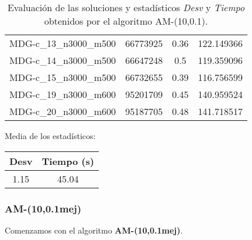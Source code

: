 \documentclass{article}
\begin{document}
\begin{table}[H]
\begin{tabular}{|cccc|}
		MDG-c\_13\_n3000\_m500 & 66773925 & 0.36 & 122.149366\\
		MDG-c\_14\_n3000\_m500 & 66647248 & 0.5 & 119.359096\\
		MDG-c\_15\_n3000\_m500 & 66732655 & 0.39 & 116.756599\\
		MDG-c\_19\_n3000\_m600 & 95201709 & 0.45 & 140.959524\\
		MDG-c\_20\_n3000\_m600 & 95187705 & 0.48 & 141.718517\\
		\hline
	\end{tabular}
	\caption{Evaluación de las soluciones y estadísticos \emph{Desv} y \emph{Tiempo} obtenidos por el algoritmo AM-(10,0.1).}
	\label{tab:am-10-01}
\end{table}

Media de los estadísticos:
\begin{table}[H]
	\centering
	\begin{tabular}{|cc|}
		\hline
		Desv & Tiempo (s)\\ \hline
		1.15 & 45.04 \\
		\hline
	\end{tabular}
\end{table}

\pagebreak

\subsubsection*{AM-(10,0.1mej)}

Comenzamos con el algoritmo \textbf{AM-(10,0.1mej)}.
\end{document}
